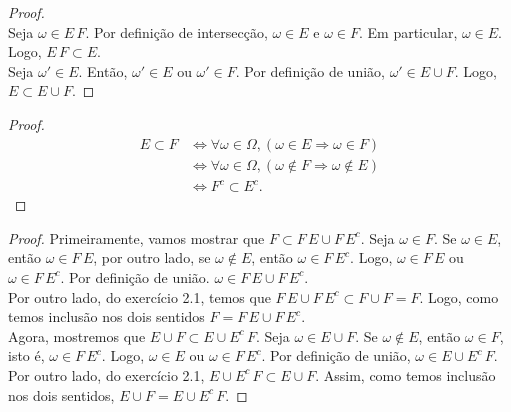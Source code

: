 \begin{questions}
\begin{solution}
\begin{proof}
	~\\
	Seja $\omega \in E\,F$. Por definição de intersecção, $\omega \in E$ e $\omega \in F$. Em particular, $\omega \in E$. Logo, $E\,F \subset E$.\\
    Seja $\omega' \in E$. Então, $\omega' \in E$ ou $\omega' \in F$. Por definição de união, $\omega' \in E \cup F$. Logo, $E \subset E \cup F$.
\end{proof}
\end{solution}

\begin{solution}
\begin{proof}
    \begin{align*}
    	E \subset F 
        	&\Leftrightarrow \forall \omega \in \Omega, 
            	(\omega \in E \Rightarrow \omega \in F)\\
			&\Leftrightarrow \forall \omega \in \Omega, 
            	(\omega \notin F \Rightarrow \omega \notin E)\\
			&\Leftrightarrow F^c \subset E^c.
    \end{align*}
\end{proof}
\end{solution}

\begin{solution}
\begin{proof}
Primeiramente, vamos mostrar que $F \subset F\,E\cup F\,E^c$. Seja $\omega \in F$. Se $\omega \in E$, então $\omega \in F\,E$, por outro lado, se $\omega \notin E$, então $\omega \in F\,E^c$. Logo, $\omega \in F\,E$ ou $\omega \in F\,E^c$. Por definição de união. $\omega \in F\,E\cup F\,E^c$.\\
Por outro lado, do exercício 2.1, temos que $F\,E\cup F\,E^c \subset F \cup F = F$. Logo,  como temos inclusão nos dois sentidos $F = F\,E\cup F\,E^c$.\\

Agora, mostremos que $E\cup F \subset E\cup E^c\,F$. Seja $\omega \in E\cup F$. Se $\omega \notin E$, então $\omega \in F$, isto é, $\omega \in F\,E^c$. Logo, $\omega \in E$ ou $\omega \in F\,E^c$. Por definição de união, $\omega \in E\cup E^c\,F$.\\
Por outro lado, do exercício 2.1, $E\cup E^c\,F \subset E\cup F$. Assim, como temos inclusão nos dois sentidos, $E\cup F = E\cup E^c\,F$.
\end{proof}
\end{solution}


\end{questions}
